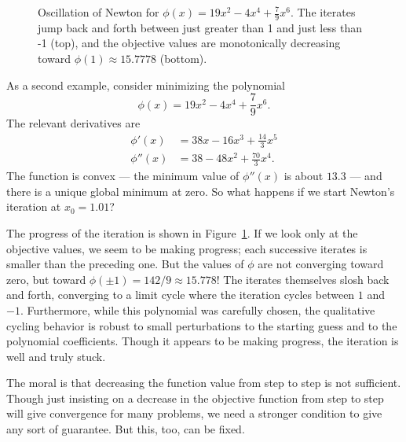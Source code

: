 \documentclass[12pt, leqno]{article} %
\begin{document}
\begin{figure}
\caption{
  Oscillation of Newton for
  $\phi(x) = 19x^2 - 4x^4 + \frac{7}{9} x^6$.
  The iterates jump back and forth between just greater than 1
  and just less than -1 (top), and the objective values are
  monotonically decreasing toward $\phi(1) \approx 15.7778$ (bottom).}
\label{fig:newton-cvg}
\end{figure}

As a second example, consider minimizing the polynomial
\[
  \phi(x) = 19x^2 - 4x^4 + \frac{7}{9} x^6.
\]
The relevant derivatives are
\begin{align*}
  \phi'(x) &= 38x - 16x^3 + \frac{14}{3} x^5 \\
  \phi''(x) &= 38 - 48x^2 + \frac{70}{3} x^4.
\end{align*}
The function is convex --- the minimum value of $\phi''(x)$ is about
$13.3$ --- and there is a unique global minimum at zero.  So what
happens if we start Newton's iteration at $x_0 = 1.01$?

The progress of the iteration is shown in Figure~\ref{fig:newton-cvg}.
If we look only at the objective values, we seem to be making
progress; each successive iterates is smaller than the preceding one.
But the values of $\phi$ are not converging toward zero, but
toward $\phi(\pm 1) = 142/9 \approx 15.778$!  The iterates themselves
slosh back and forth, converging to a limit cycle where the iteration
cycles between $1$ and $-1$.  Furthermore, while this polynomial was
carefully chosen, the qualitative cycling behavior is robust to small
perturbations to the starting guess and to the polynomial
coefficients.  Though it appears to be making progress, the iteration
is well and truly stuck.

The moral is that decreasing the function value from
step to step is not sufficient.  Though just insisting on a decrease
in the objective function from step to step will give convergence for
many problems, we need a stronger condition to give any sort of guarantee.
But this, too, can be fixed.
\end{document}
